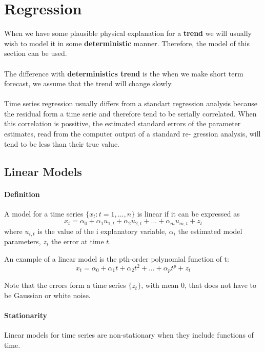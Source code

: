 \section{Regression}

When we have some plausible physical explanation for a \textbf{trend} we will usually wish to model it in some \textbf{deterministic} manner. Therefore, the model of this section can be used.
\\
\\
The difference with \textbf{deterministics trend} is the when we make short term forecast, we assume that the trend will change slowly.
\\
\\
Time series regression usually differs from a standart regression analysis because the residual form a time serie and therefore tend to be serially correlated. When this correlation is possitive, the estimated standard errors of the parameter estimates, read from the computer output of a standard re- gression analysis, will tend to be less than their true value.

\subsection{Linear Models}

\paragraph{Definition}
A model for a time series $\{ x_t : t = 1,...,n\}$ is linear if it can be expressed as
\[ x_t = \alpha_0 + \alpha_1 u_{1,t} + \alpha_2 u_{2,t} + ... + \alpha_m u_{m,t} + z_t \]
where $u_{i,t}$ is the value of the i explanatory variable, $\alpha_i$ the estimated model parameters, $z_t$ the error at time $t$.

An example of a linear model is the pth-order polynomial function of t:
\[ x_t = \alpha_0 + \alpha_1 t + \alpha_2 t^2 + ... + \alpha_p t^p + z_t \]

\begin{note} 
    Note that the errors form a time series $\{z_t\}$, with mean 0, that does not have to be Gaussian or white noise.
\end{note} 

\paragraph{Stationarity}
Linear models for time series are non-stationary when they include functions of time.

